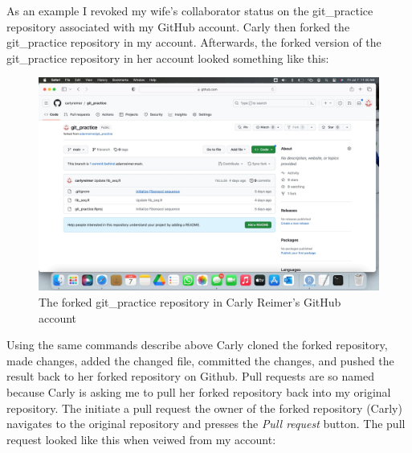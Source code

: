 \documentclass[
  letterpaper,
  DIV=11,
  numbers=noendperiod]{scrreprt}
\begin{document}
As an example I revoked my wife's collaborator status on the
git\_practice repository associated with my GitHub account. Carly then
forked the git\_practice repository in my account. Afterwards, the
forked version of the git\_practice repository in her account looked
something like this:

\begin{figure}

{\centering \includegraphics{forked_repository.png}

}

\caption{The forked git\_practice repository in Carly Reimer's GitHub
account}

\end{figure}

Using the same commands describe above Carly cloned the forked
repository, made changes, added the changed file, committed the changes,
and pushed the result back to her forked repository on Github. Pull
requests are so named because Carly is asking me to pull her forked
repository back into my original repository. The initiate a pull request
the owner of the forked repository (Carly) navigates to the original
repository and presses the \emph{Pull request} button. The pull request
looked like this when veiwed from my account:
\end{document}
